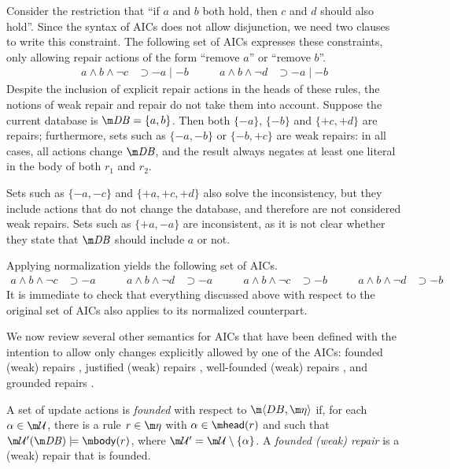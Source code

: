 \begin{example}
  \label{ex:repairs}
  Consider the restriction that ``if $a$ and $b$ both hold, then $c$ and $d$ should also hold''.
  Since the syntax of AICs does not allow disjunction, we need two clauses to write this constraint.
  The following set of AICs expresses these constraints, only allowing repair actions of the form ``remove $a$'' or ``remove $b$''.
  \begin{align*}
    a\land b\land\neg c &\supset{-a}\mid{-b}
    &\qquad
    a\land b\land\neg d &\supset{-a}\mid{-b}
  \end{align*}
  Despite the inclusion of explicit repair actions in the heads of these rules, the notions of weak repair and repair do not take them into account.
  Suppose the current database is $\db=\{a,b\}$.
  Then both $\{{-a}\}$, $\{{-b}\}$ and $\{{+c},{+d}\}$ are repairs; furthermore, sets such as $\{{-a},{-b}\}$ or $\{{-b},{+c}\}$ are weak repairs: in all cases, all actions change $\db$, and the result always negates at least one literal in the body of both $r_1$ and $r_2$.

  Sets such as $\{{-a},{-c}\}$ and $\{{+a},{+c},{+d}\}$ also solve the inconsistency, but they include actions that do not change the database, and therefore are not considered weak repairs.
  Sets such as $\{{+a},{-a}\}$ are inconsistent, as it is not clear whether they state that $\db$ should include $a$ or not.

  Applying normalization yields the following set of AICs.
  \begin{align*}
    a\land b\land\neg c &\supset{-a} &\qquad
    a\land b\land\neg d &\supset{-a} &\qquad
    a\land b\land\neg c &\supset{-b} &\qquad
    a\land b\land\neg d &\supset{-b}
  \end{align*}
  It is immediate to check that everything discussed above with respect to the original set of AICs also applies to its normalized counterpart.
\end{example}

 We now review several other semantics for AICs that have been defined with the intention to allow only changes explicitly allowed by one of the AICs: founded (weak) repairs \cite{iclp/CaropreseGSZ06}, justified (weak) repairs \cite{tplp/CaropreseT11}, well-founded (weak) repairs \cite{tase/Cruz-FilipeEGN13}, and grounded repairs \cite{iclp/Cruz-Filipe16}.

\begin{definition}
 A set of update actions \UU is \emph{founded} with respect to $\fulldb$ if, for each $\alpha \in \UU$, there is a rule  $r\in \aics$ with $\alpha\in\head(r)$ and such that $\UU'(\db)\models \body(r)$, where $\UU'=\UU\setminus\{\alpha\}$. A \emph{founded (weak) repair} is a (weak) repair that is founded.
\end{definition}

